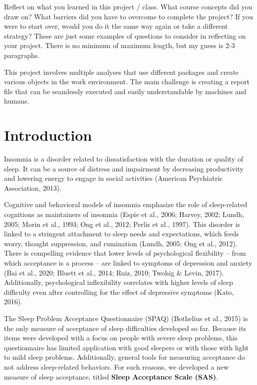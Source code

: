 \documentclass[
  letterpaper,
  DIV=11,
  numbers=noendperiod]{scrreprt}
\begin{document}

Reflect on what you learned in this project / class. What course
concepts did you draw on? What barriers did you have to overcome to
complete the project? If you were to start over, would you do it the
same way again or take a different strategy? These are just some
examples of questions to consider in reflecting on your project. There
is no minimum of maximum length, but my guess is 2-3 paragraphs.

This project involves multiple analyses that use different packages and
create various objects in the work environment. The main challenge is
creating a report file that can be seamlessly executed and easily
understandable by machines and humans.


\hypertarget{introduction}{%
\chapter{Introduction}\label{introduction}}

Insomnia is a disorder related to dissatisfaction with the duration or
quality of sleep. It can be a source of distress and impairment by
decreasing productivity and lowering energy to engage in social
activities (American Psychiatric Association, 2013).

Cognitive and behavioral models of insomnia emphasize the role of
sleep-related cognitions as maintainers of insomnia (Espie et al., 2006;
Harvey, 2002; Lundh, 2005; Morin et al., 1993; Ong et al., 2012; Perlis
et al., 1997). This disorder is linked to a stringent attachment to
sleep needs and expectations, which feeds worry, thought suppression,
and rumination (Lundh, 2005; Ong et al., 2012). There is compelling
evidence that lower levels of psychological flexibility -- from which
acceptance is a process -- are linked to symptoms of depression and
anxiety (Bai et al., 2020; Bluett et al., 2014; Ruiz, 2010; Twohig \&
Levin, 2017). Additionally, psychological inflexibility correlates with
higher levels of sleep difficulty even after controlling for the effect
of depressive symptoms (Kato, 2016).

The Sleep Problem Acceptance Questionnaire (SPAQ) (Bothelius et al.,
2015) is the only measure of acceptance of sleep difficulties developed
so far. Because its items were developed with a focus on people with
severe sleep problems, this questionnaire has limited application with
good sleepers or with those with light to mild sleep problems.
Additionally, general tools for measuring acceptance do not address
sleep-related behaviors. For such reasons, we developed a new measure of
sleep acceptance, titled \textbf{Sleep Acceptance Scale (SAS)}.
\end{document}
